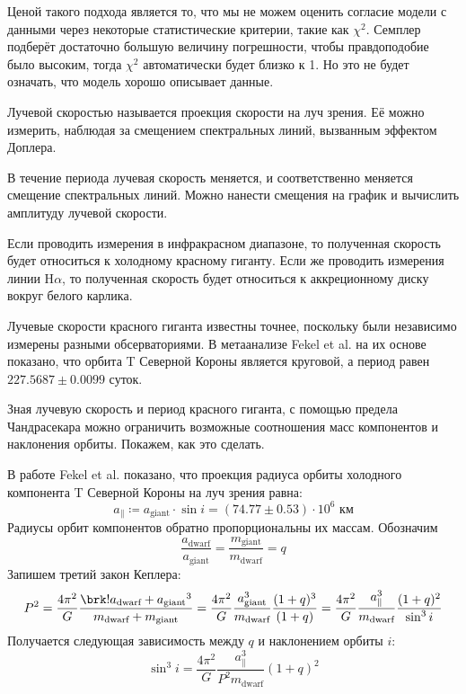 Ценой такого подхода является то, что мы не можем оценить согласие модели с данными через некоторые статистические критерии, такие как $\chi^2$. Семплер подберёт достаточно большую величину погрешности, чтобы правдоподобие было высоким, тогда $\chi^2$ автоматически будет близко к 1. Но это не будет означать, что модель хорошо описывает данные.



Лучевой скоростью называется проекция скорости на луч зрения. Её можно измерить, наблюдая за смещением спектральных линий, вызванным эффектом Доплера.

В течение периода лучевая скорость меняется, и соответственно меняется смещение спектральных линий. Можно нанести смещения на график и вычислить амплитуду лучевой скорости.


Если проводить измерения в инфракрасном диапазоне, то полученная скорость будет относиться к холодному красному гиганту. Если же проводить измерения линии H$\alpha$, то полученная скорость будет относиться к аккреционному диску вокруг белого карлика.

Лучевые скорости красного гиганта известны точнее, поскольку были независимо измерены разными обсерваториями. В метаанализе Fekel et al. \cite{RadialVelocities} на их основе показано, что орбита T Северной Короны является круговой, а период равен $227.5687 \pm 0.0099$ суток.

\label{sect:Chandrasekhar}

Зная лучевую скорость и период красного гиганта, с помощью предела Чандрасекара можно ограничить возможные соотношения масс компонентов и наклонения орбиты. Покажем, как это сделать.

В работе Fekel et al. \cite{RadialVelocities} показано, что проекция радиуса орбиты холодного компонента T Северной Короны на луч зрения равна:
\[
a_\| \coloneq a_\text{giant} \cdot \sin i = (74.77 \pm 0.53) \cdot 10^6 \text{ км}
\]
%
%
Радиусы орбит компонентов обратно пропорциональны их массам. Обозначим
\[
\frac{a_\text{dwarf}}{a_\text{giant}} = \frac{m_\text{giant}}{m_\text{dwarf}} = q
\]
Запишем третий закон Кеплера:
\[
P^2 = \frac{4\pi^2}{G} \frac{\brk!{a_\text{dwarf} + a_\text{giant}}^3}{m_\text{dwarf} + m_\text{giant}}
= \frac{4\pi^2}{G} \frac{a_\text{giant}^3}{m_\text{dwarf}} \frac{(1 + q)^3}{(1 + q)}
= \frac{4\pi^2}{G} \frac{a_\|^3}{m_\text{dwarf}} \frac{(1 + q)^2}{\sin^3 i}
\]
Получается следующая зависимость между $q$ и наклонением орбиты $i$:
\[
\sin^3 i = \frac{4\pi^2}{G} \frac{a_\|^3}{P^2 m_\text{dwarf}} (1 + q)^2
\]


